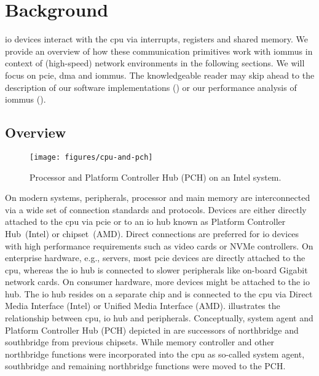 \chapter{Background}
\label{chap:background}

\Ac{io} devices interact with the \acs{cpu} via interrupts, registers and shared
memory. We provide an overview of how these communication primitives work with
\acp{iommu} in context of (high-speed) network environments in the following
sections. We will focus on \acs{pcie}, \acs{dma} and \acsp{iommu}. The
knowledgeable reader may skip ahead to the description of our software
implementations () or our performance analysis of
\acp{iommu} ().


\section{Overview}
\label{sec:overview}

\begin{figure}[!b]
    \centering
    \texttt{[image: figures/cpu-and-pch]}
    \caption{Processor and Platform Controller Hub (PCH) on an Intel system.}
    \label{fig:pch}
\end{figure}

On modern systems, peripherals, processor and main memory are interconnected via
a wide set of connection standards and protocols. Devices are either directly
attached to the \ac{cpu} via \ac{pcie} or to an \acs{io} hub known as Platform
Controller Hub~(Intel) or chipset~(AMD). Direct connections are preferred for
\ac{io} devices with high performance requirements such as video cards or NVMe
controllers. On enterprise hardware, e.g., servers, most \ac{pcie} devices are
directly attached to the \ac{cpu}, whereas the \ac{io} hub is connected to
slower peripherals like on-board Gigabit network cards. On consumer hardware,
more devices might be attached to the \ac{io} hub. The \ac{io} hub resides on a
separate chip and is connected to the \ac{cpu} via Direct Media Interface
(Intel) or Unified Media Interface (AMD).  illustrates the
relationship between \ac{cpu}, \ac{io} hub and peripherals. Conceptually,
system agent and Platform Controller Hub (PCH) depicted in  are
successors of northbridge and southbridge from previous chipsets. While memory
controller and other northbridge functions were incorporated into the \ac{cpu}
as so-called system agent, southbridge and remaining northbridge functions were
moved to the PCH.


